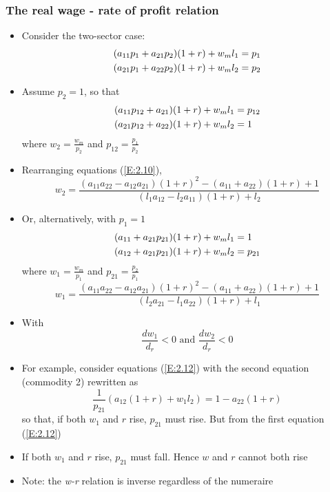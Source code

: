 \documentclass[a4paper,twoside]{article}
\numberwithin{equation}{section}
\numberwithin{figure}{section}
\begin{document}
\subsubsection{The real wage - rate of profit relation}
	\begin{itemize}
		\item Consider the two-sector case:
		\begin{gather}
			(a_{11} p_1 + a_{21} p_2) (1 + r) + w_m l_1 = p_1 \notag \\
			(a_{21} p_1 + a_{22} p_2) (1 + r) + w_m l_2 = p_2 \label{E:2.9}
		\end{gather}
		\item  Assume \( p_2 = 1 \), so that
		\begin{align}
			(a_{11} p_{12} + a_{21}) (1 + r) + w_m l_1 &= p_{12} \notag \\
			(a_{21} p_{12} + a_{22}) (1 + r) + w_m l_2 &= 1 \label{E:2.10}
		\end{align}
		where \( w_2 = \frac{w_m}{p_2} \) and \( p_{12} = \frac{p_1}{p_2} \)
		\item Rearranging equations (\ref{E:2.10}),
		\begin{equation}
			w_2 = \frac{(a_{11} a_{22} - a_{12} a_{21}) (1 + r)^2 - (a_{11} + a_{22}) (1 + r) + 1}{(l_1 a_{12} - l_2 a_{11}) (1 + r) + l_2} \label{E:2.11}
		\end{equation}
		\item Or, alternatively, with \( p_1 = 1 \)
		\begin{align}
			(a_{11} + a_{21} p_{21}) (1 + r) + w_m l_1 &= 1 \notag \\
			(a_{12} + a_{21} p_{21}) (1 + r) + w_m l_2 &= p_{21} \label{E:2.12}
		\end{align}
		where \( w_1 = \frac{w_m}{p_1} \) and \( p_{21} = \frac{p_2}{p_1} \)
		\begin{equation}
			w_1 = \frac{(a_{11} a_{22} - a_{12} a_{21}) (1 + r)^2 - (a_{11} + a_{22}) (1 + r) + 1}{(l_2 a_{21} - l_1 a_{22}) (1 + r) + l_1} \label{E:2.13}
		\end{equation}
		\item With
		\[
			\frac{dw_1}{d_r} < 0 \text{ and } \frac{dw_2}{d_r} < 0
		\]
		\item  For example, consider equations (\ref{E:2.12}) with the second equation (commodity 2) rewritten as
		\[
			\frac{1}{p_{21}} (a_{12} (1 + r) + w_1 l_2) = 1 - a_{22} (1 + r)
		\]
		so that, if both \( w_1 \) and \( r \) rise, \( p_{21} \) must rise. But from the first equation (\ref{E:2.12})
		\item If both \( w_1 \) and \( r \) rise, \( p_{21} \) must fall. Hence \( w \) and \( r \) cannot both rise
		\item Note: the \textit{w-r} relation is inverse regardless of the numeraire
	\end{itemize}
\end{document}
